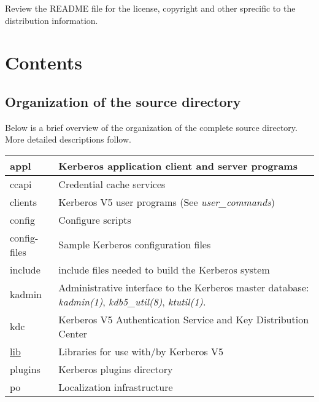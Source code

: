 \documentclass[letterpaper,10pt,english]{sphinxmanual}
\begin{document}
Review the README file for the license, copyright and other sprecific to the
distribution information.


\chapter{Contents}
\label{build/index:contents}

\section{Organization of the source directory}
\label{build/directory_org::doc}\label{build/directory_org:organization-of-the-source-directory}
Below is a brief overview of the organization of the complete source
directory.  More detailed descriptions follow.

\begin{tabulary}{\linewidth}{|L|L|}
\hline

appl
 & 
Kerberos application client and server programs
\\\hline

ccapi
 & 
Credential cache services
\\\hline

clients
 & 
Kerberos V5 user programs (See \emph{user\_commands})
\\\hline

config
 & 
Configure scripts
\\\hline

config-files
 & 
Sample Kerberos configuration files
\\\hline

include
 & 
include files needed to build the Kerberos system
\\\hline

kadmin
 & 
Administrative interface to the Kerberos master database: \emph{kadmin(1)}, \emph{kdb5\_util(8)}, \emph{ktutil(1)}.
\\\hline

kdc
 & 
Kerberos V5 Authentication Service and Key Distribution Center
\\\hline

{\hyperref[build/directory_org:lib]{lib}}
 & 
Libraries for use with/by Kerberos V5
\\\hline

plugins
 & 
Kerberos plugins directory
\\\hline

po
 & 
Localization infrastructure
\\\hline


\end{tabulary}
\end{document}
